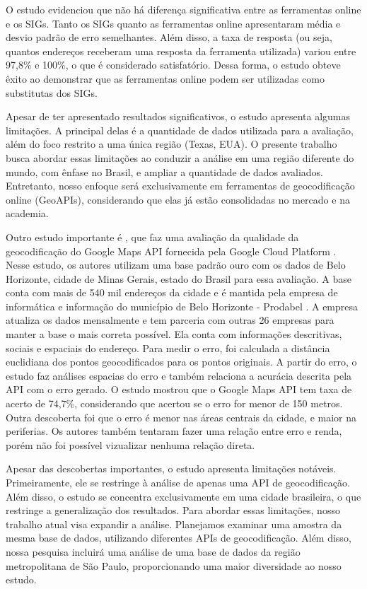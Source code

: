 O estudo evidenciou que não há diferença significativa entre as ferramentas online e os SIGs. Tanto os SIGs quanto as ferramentas online apresentaram média e desvio padrão de erro semelhantes. Além disso, a taxa de resposta (ou seja, quantos endereços receberam uma resposta da ferramenta utilizada) variou entre 97,8\% e 100\%, o que é considerado satisfatório. Dessa forma, o estudo obteve êxito ao demonstrar que as ferramentas online podem ser utilizadas como substitutas dos SIGs.

Apesar de \cite{Chow2016} ter apresentado resultados significativos, o estudo apresenta algumas limitações. A principal delas é a quantidade de dados utilizada para a avaliação, além do foco restrito a uma única região (Texas, EUA). O presente trabalho busca abordar essas limitações ao conduzir a análise em uma região diferente do mundo, com ênfase no Brasil, e ampliar a quantidade de dados avaliados. Entretanto, nosso enfoque será exclusivamente em ferramentas de geocodificação online (GeoAPIs), considerando que elas já estão consolidadas no mercado e na academia.

Outro estudo importante é \cite{Clodoveu2011}, que faz uma avaliação da qualidade da geocodificação do Google Maps API fornecida pela Google Cloud Platform \cite{GCP}. Nesse estudo, os autores utilizam uma base padrão ouro com os dados de Belo Horizonte, cidade de Minas Gerais, estado do Brasil para essa avaliação. A base conta com mais de 540 mil endereços da cidade e é mantida pela empresa de informática e informação do município de Belo Horizonte - Prodabel \cite{Prodabel}. A empresa atualiza os dados mensalmente e tem parceria com outras 26 empresas para manter a base o mais correta possível. Ela conta com informações descritivas, sociais e espaciais do endereço. Para medir o erro, foi calculada a distância euclidiana dos pontos geocodificados para os pontos originais. A partir do erro, o estudo faz análises espacias do erro e também relaciona a acurácia descrita pela API com o erro gerado. O estudo mostrou que o Google Maps API tem taxa de acerto de 74,7\%, considerando que acertou se o erro for menor de 150 metros. Outra descoberta foi que o erro é menor nas áreas centrais da cidade, e maior na periferias. Os autores também tentaram fazer uma relação entre erro e renda, porém não foi possível vizualizar nenhuma relação direta.

Apesar das descobertas importantes, o estudo apresenta limitações notáveis. Primeiramente, ele se restringe à análise de apenas uma API de geocodificação. Além disso, o estudo se concentra exclusivamente em uma cidade brasileira, o que restringe a generalização dos resultados. Para abordar essas limitações, nosso trabalho atual visa expandir a análise. Planejamos examinar uma amostra da mesma base de dados, utilizando diferentes APIs de geocodificação. Além disso, nossa pesquisa incluirá uma análise de uma base de dados da região metropolitana de São Paulo, proporcionando uma maior diversidade ao nosso estudo.

